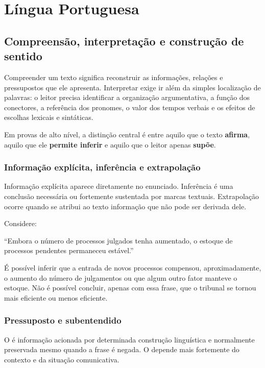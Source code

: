\chapter{Língua Portuguesa}

\section{Compreensão, interpretação e construção de sentido}

Compreender um texto significa reconstruir as informações, relações e pressupostos que ele apresenta. Interpretar exige ir além da simples localização de palavras: o leitor precisa identificar a organização argumentativa, a função dos conectores, a referência dos pronomes, o valor dos tempos verbais e os efeitos de escolhas lexicais e sintáticas.

Em provas de alto nível, a distinção central é entre aquilo que o texto \textbf{afirma}, aquilo que ele \textbf{permite inferir} e aquilo que o leitor apenas \textbf{supõe}.

\subsection{Informação explícita, inferência e extrapolação}

Informação explícita aparece diretamente no enunciado. Inferência é uma conclusão necessária ou fortemente sustentada por marcas textuais. Extrapolação ocorre quando se atribui ao texto informação que não pode ser derivada dele.

\begin{exemplo}
Considere:

``Embora o número de processos julgados tenha aumentado, o estoque de processos pendentes permaneceu estável.''

É possível inferir que a entrada de novos processos compensou, aproximadamente, o aumento do número de julgamentos ou que algum outro fator manteve o estoque. Não é possível concluir, apenas com essa frase, que o tribunal se tornou mais eficiente ou menos eficiente.
\end{exemplo}

\subsection{Pressuposto e subentendido}

O  é informação acionada por determinada construção linguística e normalmente preservada mesmo quando a frase é negada. O  depende mais fortemente do contexto e da situação comunicativa.

